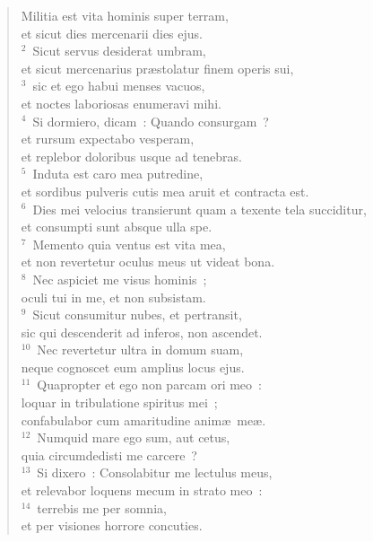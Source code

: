 \begin{flushleft}\begin{verse}\vspace{-19pt}Militia est vita hominis super terram,\\ et sicut dies mercenarii dies ejus.\\
${}^{2}$~Sicut servus desiderat umbram,\\ et sicut mercenarius pr\ae stolatur finem operis sui,\\
${}^{3}$~sic et ego habui menses vacuos,\\ et noctes laboriosas enumeravi mihi.\\
${}^{4}$~Si dormiero, dicam~: Quando consurgam~?\\ et rursum expectabo vesperam,\\ et replebor doloribus usque ad tenebras.\\
${}^{5}$~Induta est caro mea putredine,\\ et sordibus pulveris cutis mea aruit et contracta est.\\
${}^{6}$~Dies mei velocius transierunt quam a texente tela succiditur,\\ et consumpti sunt absque ulla spe.\\
${}^{7}$~Memento quia ventus est vita mea,\\ et non revertetur oculus meus ut videat bona.\\
${}^{8}$~Nec aspiciet me visus hominis~;\\ oculi tui in me, et non subsistam.\\
${}^{9}$~Sicut consumitur nubes, et pertransit,\\ sic qui descenderit ad inferos, non ascendet.\\
${}^{10}$~Nec revertetur ultra in domum suam,\\ neque cognoscet eum amplius locus ejus.\\
${}^{11}$~Quapropter et ego non parcam ori meo~:\\ loquar in tribulatione spiritus mei~;\\ confabulabor cum amaritudine anim\ae\ me\ae .\\
${}^{12}$~Numquid mare ego sum, aut cetus,\\ quia circumdedisti me carcere~?\\
${}^{13}$~Si dixero~: Consolabitur me lectulus meus,\\ et relevabor loquens mecum in strato meo~:\\
${}^{14}$~terrebis me per somnia,\\ et per visiones horrore concuties.\\

\end{verse}
\end{flushleft}
